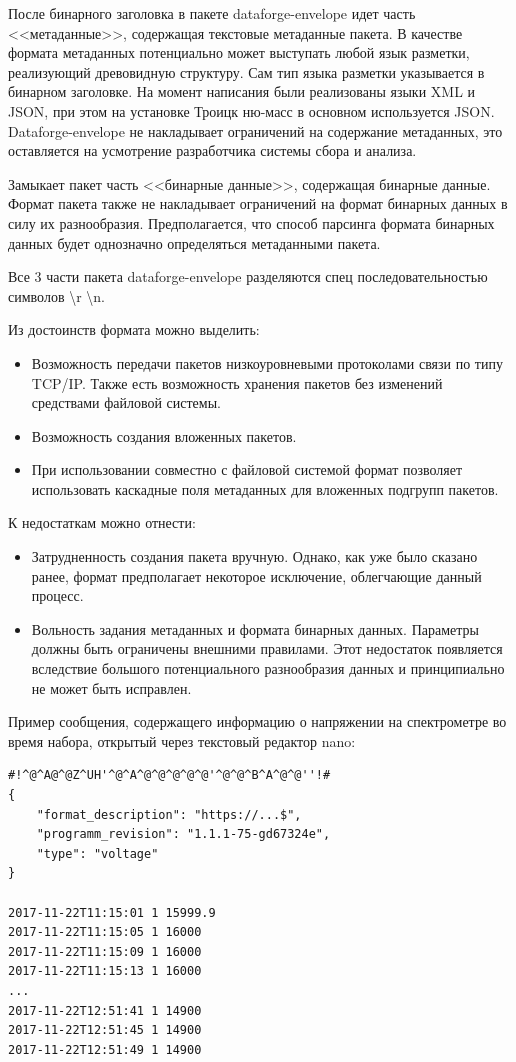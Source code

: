 \documentclass[a4paper,14pt]{extreport}
\begin{document}
После бинарного заголовка в пакете dataforge-envelope идет часть <<метаданные>>, содержащая текстовые метаданные пакета. В качестве формата метаданных потенциально может выступать любой язык разметки, реализующий древовидную структуру. Сам тип языка разметки указывается в бинарном заголовке. На момент написания были реализованы языки XML и JSON, при этом на установке Троицк ню-масс в основном используется JSON. Dataforge-envelope не накладывает ограничений на содержание метаданных, это оставляется на усмотрение разработчика системы сбора и анализа.

Замыкает пакет часть <<бинарные данные>>, содержащая бинарные данные. Формат пакета также не накладывает ограничений на формат бинарных данных в силу их разнообразия. Предполагается, что способ парсинга формата бинарных данных будет однозначно определяться метаданными пакета.

Все 3 части пакета dataforge-envelope разделяются спец последовательностью символов \colorbox{Gainsboro!60!Lavender}{\textbackslash r \textbackslash n}.

Из достоинств формата можно выделить:
\begin{itemize}
    \item Возможность передачи пакетов низкоуровневыми протоколами связи по типу TCP/IP. Также есть возможность хранения пакетов без изменений средствами файловой системы.
    \item Возможность создания вложенных пакетов.
    \item При использовании совместно с файловой системой формат позволяет использовать каскадные поля метаданных для вложенных подгрупп пакетов.
\end{itemize}
К недостаткам можно отнести:
\begin{itemize}
    \item Затрудненность создания пакета вручную. Однако, как уже было сказано ранее, формат предполагает некоторое исключение, облегчающие данный процесс.
    \item Вольность задания метаданных и формата бинарных данных. Параметры должны быть ограничены внешними правилами. Этот недостаток появляется вследствие большого потенциального разнообразия данных и принципиально не может быть исправлен.
\end{itemize}
Пример сообщения, содержащего информацию о напряжении на спектрометре во время набора, открытый через текстовый редактор nano:
\begin{lstlisting}[caption={Пример сообщения в формате Dataforge Envelope.}, captionpos=b]
#!^@^A@^@Z^UH'^@^A^@^@^@^@^@'^@^@^B^A^@^@''!#
{
    "format_description": "https://...$",
    "programm_revision": "1.1.1-75-gd67324e",
    "type": "voltage"
}

2017-11-22T11:15:01 1 15999.9
2017-11-22T11:15:05 1 16000
2017-11-22T11:15:09 1 16000
2017-11-22T11:15:13 1 16000
...
2017-11-22T12:51:41 1 14900
2017-11-22T12:51:45 1 14900
2017-11-22T12:51:49 1 14900
\end{lstlisting}
\end{document}
